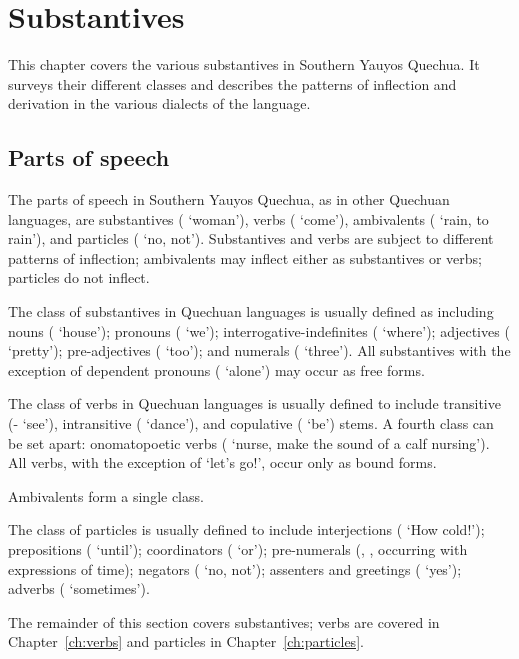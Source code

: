 \chapter{Substantives}\label{ch:substantives}
This chapter covers the various substantives in Southern Yauyos Quechua. It surveys their different classes and describes the patterns of inflection and derivation in the various dialects of the language.

\section{Parts of speech}
The parts of speech in Southern Yauyos Quechua, as in other Quechuan languages, are substantives ( ‘woman’), verbs ( ‘come’), ambivalents ( ‘rain, to rain’), and particles ( ‘no, not’). Substantives and verbs are subject to different patterns of inflection; ambivalents may inflect either as substantives or verbs; particles do not inflect.

The class of substantives in Quechuan languages is usually defined as including nouns ( ‘house’); pronouns ( ‘we’); interrogative-indefinites ( ‘where’); adjectives ( ‘pretty’); pre-adjectives ( ‘too’); and numerals ( ‘three’). All substantives with the exception of dependent pronouns ( ‘alone’) may occur as free forms.

The class of verbs in Quechuan languages is usually defined to include transitive (- ‘see’), intransitive ( ‘dance’), and copulative ( ‘be’) stems. A fourth class can be set apart: onomatopoetic verbs ( ‘nurse, make the sound of a calf nursing’). All verbs, with the exception of  ‘let’s go!’, occur only as bound forms.

Ambivalents form a single class.

The class of particles is usually defined to include interjections ( ‘How cold!’); prepositions ( ‘until’); coordinators ( ‘or’); pre-numerals (, , occurring with expressions of time); negators ( ‘no, not’); assenters and greetings ( ‘yes’); adverbs ( ‘sometimes’).

The remainder of this section covers substantives; verbs are covered in Chapter~\ref{ch:verbs} and particles in Chapter~\ref{ch:particles}.

